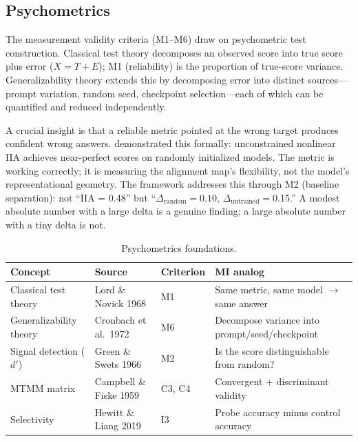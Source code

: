\documentclass[10pt]{article}
\begin{document}
\subsection{Psychometrics}
\label{sec:psychometrics}

The measurement validity criteria (M1--M6) draw on psychometric test construction. Classical test theory decomposes an observed score into true score plus error ($X = T + E$); M1 (reliability) is the proportion of true-score variance. Generalizability theory extends this by decomposing error into distinct sources---prompt variation, random seed, checkpoint selection---each of which can be quantified and reduced independently.

A crucial insight is that a reliable metric pointed at the wrong target produces confident wrong answers. \citet{sutter2025nonlinear} demonstrated this formally: unconstrained nonlinear IIA achieves near-perfect scores on randomly initialized models. The metric is working correctly; it is measuring the alignment map's flexibility, not the model's representational geometry. The framework addresses this through M2 (baseline separation): not ``IIA = 0.48'' but ``$\Delta_{\text{random}} = 0.10$, $\Delta_{\text{untrained}} = 0.15$.'' A modest absolute number with a large delta is a genuine finding; a large absolute number with a tiny delta is not.

\begin{table}[H]
\centering\small
\caption{Psychometrics foundations.}
\renewcommand{\arraystretch}{1.12}
\begin{tabular}{@{}l>{\raggedright\arraybackslash}p{2.2cm}l>{\raggedright\arraybackslash}p{4.5cm}@{}}
\toprule
\textbf{Concept} & \textbf{Source} & \textbf{Criterion} & \textbf{MI analog} \\
\midrule
Classical test theory & Lord \& Novick 1968 & M1 & Same metric, same model $\to$ same answer \\
\midrule
Generalizability theory & Cronbach et al.\ 1972 & M6 & Decompose variance into prompt/seed/checkpoint \\
\midrule
Signal detection ($d'$) & Green \& Swets 1966 & M2 & Is the score distinguishable from random? \\
\midrule
MTMM matrix & Campbell \& Fiske 1959 & C3, C4 & Convergent + discriminant validity \\
\midrule
Selectivity & Hewitt \& Liang 2019 & I3 & Probe accuracy minus control accuracy \\
\bottomrule
\end{tabular}
\end{table}
\end{document}
